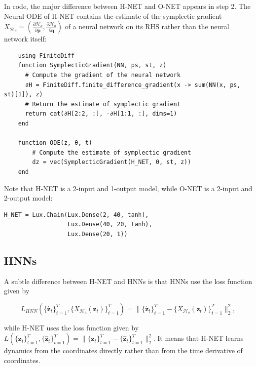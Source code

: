 \documentclass[
	parskip, 			   %
	twoside, 			   %
	DIV=14, 			   %
	BCOR=15.0mm, 		   %
	headsepline, 		   %
	open=right, 		   %
	captions=tableheading, %
	bibliography=totoc,    %
	numbers=noenddot       %
]{scrreprt}
\begin{document}
In code, the major difference between H-NET and O-NET appears in step 2. The Neural ODE of H-NET contains the estimate of the symplectic gradient $X_{\mathcal{H}_{\theta}}=(\frac{\partial \mathcal{H}_{\theta}}{\partial \mathbf{p}}, \frac{\partial \mathcal{H}_{\theta}}{\partial \mathbf{q}})$ of a neural network on its RHS rather than the neural network itself:

\begin{verbatim}
    using FiniteDiff
    function SymplecticGradient(NN, ps, st, z) 
      # Compute the gradient of the neural network
      ∂H = FiniteDiff.finite_difference_gradient(x -> sum(NN(x, ps, st)[1]), z)
      # Return the estimate of symplectic gradient
      return cat(∂H[2:2, :], -∂H[1:1, :], dims=1)
    end

    function ODE(z, θ, t)
        # Compute the estimate of symplectic gradient
        dz = vec(SymplecticGradient(H_NET, θ, st, z))
    end
\end{verbatim}

Note that H-NET is a 2-input and 1-output model, while O-NET is a 2-input and 2-output model:

\begin{verbatim}
H_NET = Lux.Chain(Lux.Dense(2, 40, tanh),
                  Lux.Dense(40, 20, tanh),
                  Lux.Dense(20, 1))
\end{verbatim}

\subsection{HNNs}
A subtle difference between H-NET and HNNs is that HNNs use the loss function given by

\begin{equation}
    \label{eq:loss_HNNs}
    L_{HNN}(\{ \dot{\mathbf{z}_{t}} \}_{t=1}^{T}, \{ X_{\mathcal{H}_{\theta}}(\mathbf{z}_{t}) \}_{t=1}^{T}) = \lVert \{ \dot{\mathbf{z}_{t}} \}_{t=1}^{T} - \{ X_{\mathcal{H}_{\theta}}(\mathbf{z}_{t}) \}_{t=1}^{T} \rVert_{2}^{2},
\end{equation}

while H-NET uses the loss function given by $ L(\{ \mathbf{z}_{t} \}_{t=1}^{T}, \{ \mathbf{\hat{z}}_{t} \}_{t=1}^{T}) = \lVert \{ \mathbf{z}_{t} \}_{t=1}^{T} - \{ \mathbf{\hat{z}}_{t} \}_{t=1}^{T} \rVert_{2}^{2} $. It means that H-NET learns dynamics from the coordinates directly rather than from the time derivative of coordinates.
\end{document}
